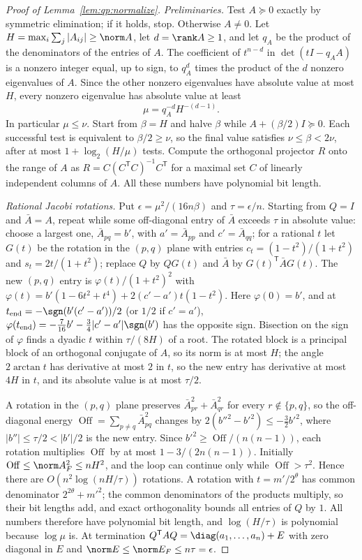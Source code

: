 \begin{proof}[Proof of Lemma~\ref{lem:qp:normalize}]
\emph{Preliminaries.} Test $A\succeq0$ exactly by symmetric elimination; if it
holds, stop. Otherwise $A\ne0$. Let $H=\max_i\sum_j|A_{ij}|\ge\norm A$, let
$d=\rank A\ge1$, and let $q_A$ be the product of the denominators of the
entries of $A$. The coefficient of $t^{n-d}$ in $\det(tI-q_AA)$ is a nonzero
integer equal, up to sign, to $q_A^d$ times the product of the $d$ nonzero
eigenvalues of $A$. Since the other nonzero eigenvalues have absolute value at
most $H$, every nonzero eigenvalue has absolute value at least
\[
 \mu=q_A^{-d}H^{-(d-1)} .
\]
In particular $\mu\le\nu$. Start from $\beta=H$ and halve $\beta$ while
$A+(\beta/2)I\succeq0$. Each successful test is equivalent to $\beta/2\ge\nu$,
so the final value satisfies $\nu\le\beta<2\nu$, after at most
$1+\log_2(H/\mu)$ tests. Compute the orthogonal projector $R$ onto the range of
$A$ as $R=C(C^{\mathsf T} C)^{-1}C^{\mathsf T}$ for a maximal set $C$ of linearly
independent columns of $A$. All these numbers have polynomial bit length.

\emph{Rational Jacobi rotations.} Put $\epsilon=\mu^2/(16n\beta)$ and
$\tau=\epsilon/n$. Starting from $Q=I$ and $\bar A=A$, repeat while some
off-diagonal entry of $\bar A$ exceeds $\tau$ in absolute value: choose a
largest one, $\bar A_{pq}=b'$, with $a'=\bar A_{pp}$ and $c'=\bar A_{qq}$; for a
rational $t$ let $G(t)$ be the rotation in the $(p,q)$ plane with entries
$c_t=(1-t^2)/(1+t^2)$ and $s_t=2t/(1+t^2)$; replace $Q$ by $QG(t)$ and $\bar A$
by $G(t)^{\mathsf T}\bar AG(t)$. The new $(p,q)$ entry is
$\varphi(t)/(1+t^2)^2$ with
$\varphi(t)=b'(1-6t^2+t^4)+2(c'-a')t(1-t^2)$. Here $\varphi(0)=b'$, and at
$t_{\rm end}=-\sgn(b'(c'-a'))/2$ (or $1/2$ if $c'=a'$),
$\varphi(t_{\rm end})=-\frac7{16}b'-\frac34|c'-a'|\sgn(b')$ has the opposite
sign. Bisection on the sign of $\varphi$ finds a dyadic $t$ within
$\tau/(8H)$ of a root. The rotated block is a principal block of an orthogonal
conjugate of $A$, so its norm is at most $H$; the angle $2\arctan t$ has
derivative at most $2$ in $t$, so the new entry has derivative at most $4H$ in
$t$, and its absolute value is at most $\tau/2$.

A rotation in the $(p,q)$ plane preserves $\bar A_{pr}^2+\bar A_{qr}^2$ for
every $r\notin\{p,q\}$, so the off-diagonal energy
$\operatorname{Off}=\sum_{p\ne q}\bar A_{pq}^2$ changes by
$2(b''^2-b'^2)\le-\frac32b'^2$, where $|b''|\le\tau/2<|b'|/2$ is the new entry.
Since $b'^2\ge\operatorname{Off}/(n(n-1))$, each rotation multiplies
$\operatorname{Off}$ by at most $1-3/(2n(n-1))$. Initially
$\operatorname{Off}\le\norm A_F^2\le nH^2$, and the loop can continue only while
$\operatorname{Off}>\tau^2$. Hence there are $O(n^2\log(nH/\tau))$ rotations.
A rotation with $t=m'/2^{\theta}$ has common denominator $2^{2\theta}+m'^2$; the
common denominators of the products multiply, so their bit lengths add, and
exact orthogonality bounds all entries of $Q$ by $1$. All numbers therefore
have polynomial bit length, and $\log(H/\tau)$ is polynomial because $\log\mu$
is. At termination $Q^{\mathsf T} AQ=\diag(a_1,\dots,a_n)+E$ with zero diagonal in
$E$ and $\norm E\le\norm E_F\le n\tau=\epsilon$.


\end{proof}

